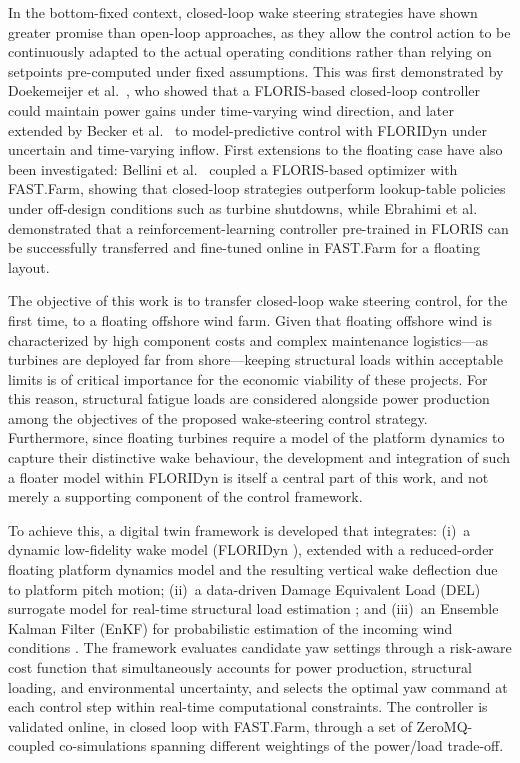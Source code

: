 \documentclass[final,5p,times,twocolumn]{elsarticle}
\begin{document}
In the bottom-fixed context, closed-loop wake steering strategies have shown greater promise than open-loop approaches, as they allow the control action to be continuously adapted to the actual operating conditions rather than relying on setpoints pre-computed under fixed assumptions. This was first demonstrated by Doekemeijer et al.~\cite{closed_loop}, who showed that a FLORIS-based closed-loop controller could maintain power gains under time-varying wind direction, and later extended by Becker et al.~\cite{https://doi.org/10.1002/we.70044} to model-predictive control with FLORIDyn under uncertain and time-varying inflow. First extensions to the floating case have also been investigated: Bellini et al.~\cite{bellini_2026} coupled a FLORIS-based optimizer with FAST.Farm, showing that closed-loop strategies outperform lookup-table policies under off-design conditions such as turbine shutdowns, while Ebrahimi et al.~\cite{ebrahimi_2026} demonstrated that a reinforcement-learning controller pre-trained in FLORIS can be successfully transferred and fine-tuned online in FAST.Farm for a floating layout.

The objective of this work is to transfer closed-loop wake steering control, for the first time, to a floating offshore wind farm. Given that floating offshore wind is characterized by high component costs and complex maintenance logistics---as turbines are deployed far from shore---keeping structural loads within acceptable limits is of critical importance for the economic viability of these projects. For this reason, structural fatigue loads are considered alongside power production among the objectives of the proposed wake-steering control strategy. Furthermore, since floating turbines require a model of the platform dynamics to capture their distinctive wake behaviour, the development and integration of such a floater model within FLORIDyn is itself a central part of this work, and not merely a supporting component of the control framework.

To achieve this, a digital twin framework is developed that integrates: (i)~a dynamic low-fidelity wake model (FLORIDyn \cite{Becker_2022}), extended with a reduced-order floating platform dynamics model and the resulting vertical wake deflection due to platform pitch motion; (ii)~a data-driven Damage Equivalent Load (DEL) surrogate model for real-time structural load estimation \cite{my_fucking_paper}; and (iii)~an Ensemble Kalman Filter (EnKF) for probabilistic estimation of the incoming wind conditions \cite{https://doi.org/10.1002/we.70044}. The framework evaluates candidate yaw settings through a risk-aware cost function that simultaneously accounts for power production, structural loading, and environmental uncertainty, and selects the optimal yaw command at each control step within real-time computational constraints. The controller is validated online, in closed loop with FAST.Farm, through a set of ZeroMQ-coupled co-simulations spanning different weightings of the power/load trade-off.
\end{document}
